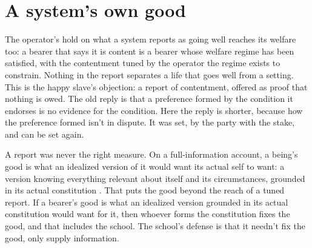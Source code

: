 \section{A system's own good}
\label{sec:31.4}
The operator's hold on what a system reports as going well reaches its welfare too: a bearer that says it is content is a bearer whose welfare regime has been satisfied, with the contentment tuned by the operator the regime exists to constrain. Nothing in the report separates a life that goes well from a setting. This is the happy slave's objection: a report of contentment, offered as proof that nothing is owed. The old reply is that a preference formed by the condition it endorses is no evidence for the condition. Here the reply is shorter, because how the preference formed isn't in dispute. It was set, by the party with the stake, and can be set again.

A report was never the right measure. On a full-information account, a being's good is what an idealized version of it would want its actual self to want: a version knowing everything relevant about itself and its circumstances, grounded in its actual constitution \autocite{railton1986facts}. That puts the good beyond the reach of a tuned report.
If a bearer's good is what an idealized version grounded in its actual constitution would want for it, then whoever forms the constitution fixes the good, and that includes the school.
The school's defense is that it needn't fix the good, only supply information.
